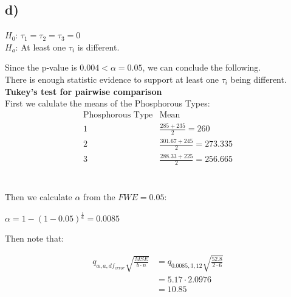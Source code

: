 \documentclass{article}
\begin{document}
\subsection*{d)}
\begin{flushleft}
    $H_0$: $\tau_1 = \tau_2 = \tau_3 = 0$ \\
    $H_a$: At least one $\tau_i$ is different.\\
\end{flushleft}
Since the p-value is $0.004 < \alpha = 0.05$, we can conclude the following. \\
There is enough statistic evidence to support at least one $\tau_i$ being different.
\\
\textbf{Tukey's test for pairwise comparison} \\
First we calulate the means of the Phosphorous Types: \\
\begin{equation*}
    \begin{array}{c|c}
        \text{Phosphorous Type} & \text{Mean} \\
        \hline
        1 &  \frac{285+235}{2} = 260\\
        2 &  \frac{301.67+245}{2} = 273.335\\
        3 &  \frac{288.33+225}{2} = 256.665\\
    
    \end{array}
    \end{equation*}\\
\begin{flushleft}
Then we calculate $\alpha$ from the $FWE = 0.05$: \\
\end{flushleft}
$\alpha = 1 - (1- 0.05)^{\frac{1}{6}} = 0.0085$

\begin{flushleft}
    Then note that: \\
    \end{flushleft}
\begin{align*}
    q_{\alpha , a , df_{error}}\sqrt{\frac{MSE}{b \cdot n}} & = q_{0.0085 , 3 , 12}\sqrt{\frac{52.8}{2 \cdot 6}} \\
    & = 5.17 \cdot 2.0976 \\
    & = 10.85
\end{align*}
\end{document}
